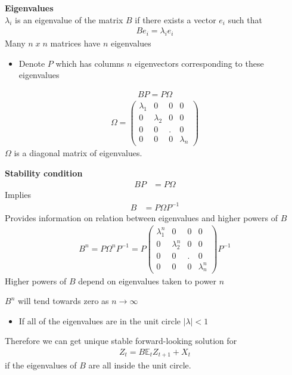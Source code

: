 \documentclass{beamer}
\begin{document}
\begin{frame}
  \textbf{Eigenvalues}\\
  $\lambda_i$ is an eigenvalue of the matrix $B$ if there exists a vector $e_i$ such that 
  \begin{align}
     Be_i=\lambda_i e_i 
  \end{align}
  \medskip
   Many $n\;x\;n$ matrices have $n$ eigenvalues
   \begin{itemize}
      \item Denote $P$ which has columns $n$ eigenvectors corresponding to these eigenvalues
    \end{itemize} 
   \begin{align}
     BP=P\Omega
   \end{align}
\begin{align}
  \Omega=\begin{pmatrix}
    \lambda_1 &0 &0 &0\\
    0 &\lambda_2 &0 &0\\
    0 & 0 & . &0\\
    0 &0 &0 & \lambda_n
  \end{pmatrix}
\end{align}
$\Omega$ is a diagonal matrix of eigenvalues. 
\end{frame}

\begin{frame}
  \textbf{Stability condition}
  \begin{align}
    BP&=P\Omega
  \end{align}
  Implies
  \begin{align}     
    B&=P\Omega P^{-1}
  \end{align}
 Provides information on relation between eigenvalues and higher powers of $B$
\begin{align}
  B^n=P\Omega^n P^{-1} = P \begin{pmatrix}
    \lambda_1^n &0 &0 &0\\
    0 &\lambda_2^n &0 &0\\
    0 & 0 & . &0\\
    0 &0 &0 & \lambda_n^n
  \end{pmatrix}
  P^{-1}
\end{align}
\medskip
Higher powers of $B$ depend on eigenvalues taken to power $n$
\end{frame}

\begin{frame}
  $B^n$ will tend towards zero as $n \rightarrow \infty$
  \begin{itemize}
    \item If all of the eigenvalues are in the unit circle $|\lambda|<1$
  \end{itemize}
  \medskip
  Therefore we can get unique stable forward-looking solution for 
  \begin{align}
    Z_t=B\mathbb{E}_tZ_{t+1} + X_t
  \end{align}
  if the eigenvalues of $B$ are all inside the unit circle.   
\end{frame}
\end{document}
